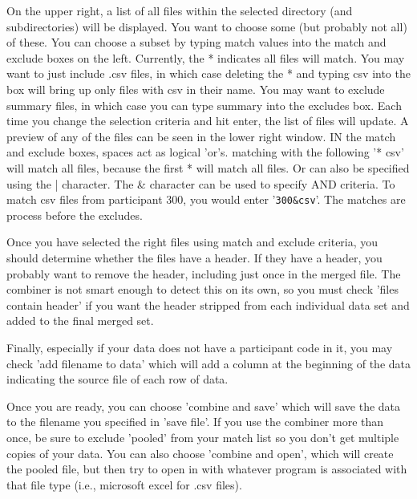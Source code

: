 On the upper right, a list of all files within the selected directory (and subdirectories) will be displayed.  You want to choose some (but probably not all) of these.  You can choose a subset by typing match values into the match and exclude boxes on the left.  Currently, the * indicates all files will match.  You may want to just include .csv files, in which case deleting the * and typing csv into the box will bring up only files with csv in their name.  You may want to exclude summary files, in which case you can type summary into the excludes box.  Each time you change the selection criteria and hit enter, the list of files will update.  A preview of any of the files can be seen in the lower right window.  IN the match and exclude boxes, spaces act as logical 'or's.  matching with the following '* csv' will match all files, because the first * will match all files. Or can also be specified using the | character.  The \& character can be used to specify AND criteria.  To match csv files from participant 300, you would enter '\texttt{300\&csv}'.  The matches are process before the excludes.

Once you have selected the right files using match and exclude criteria, you should determine whether the files have a header. If they have a header, you probably want to remove the header, including just once in the merged file. The combiner is not smart enough to detect this on its own, so you must check 'files contain header' if you want the header stripped from each individual data set and added to the final merged set.

Finally, especially if your data does not have a participant code in it, you may check 'add filename to data' which will add a column at the beginning of the data indicating the source file of each row of data.

Once you are ready, you can choose 'combine and save' which will save the data to the filename you specified in 'save file'.  If you use the combiner more than once, be sure to exclude 'pooled' from your match list so you don't get multiple copies of your data.  You can also choose 'combine and  open', which will create the pooled file, but then try to open in with whatever program is associated with that file type (i.e., microsoft excel for .csv files).

